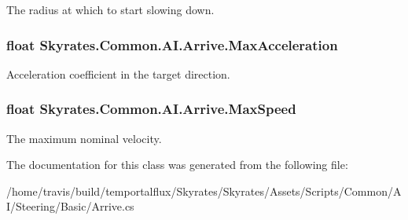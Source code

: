 The radius at which to start slowing down. 

\hypertarget{class_skyrates_1_1_common_1_1_a_i_1_1_arrive_a97aaffa0306389d11c5d75faf0d3f7c9}{
\subsubsection[{Max\-Acceleration}]{\setlength{\rightskip}{0pt plus 5cm}float Skyrates.\-Common.\-A\-I.\-Arrive.\-Max\-Acceleration}}\label{class_skyrates_1_1_common_1_1_a_i_1_1_arrive_a97aaffa0306389d11c5d75faf0d3f7c9}


Acceleration coefficient in the target direction. 

\hypertarget{class_skyrates_1_1_common_1_1_a_i_1_1_arrive_a85ab230f89389f96567f11f0fc70d666}{
\subsubsection[{Max\-Speed}]{\setlength{\rightskip}{0pt plus 5cm}float Skyrates.\-Common.\-A\-I.\-Arrive.\-Max\-Speed}}\label{class_skyrates_1_1_common_1_1_a_i_1_1_arrive_a85ab230f89389f96567f11f0fc70d666}


The maximum nominal velocity. 



The documentation for this class was generated from the following file\-:\begin{DoxyCompactItemize}
\item 
/home/travis/build/temportalflux/\-Skyrates/\-Skyrates/\-Assets/\-Scripts/\-Common/\-A\-I/\-Steering/\-Basic/Arrive.\-cs\end{DoxyCompactItemize}
